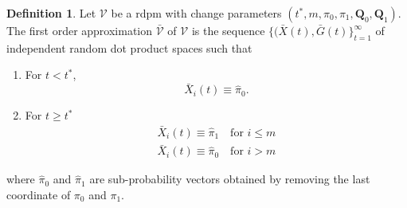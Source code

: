 \documentclass[final]{IEEEtran}
\theoremstyle{definition}
\newtheorem{definition}{Definition}
\begin{document}
\begin{definition}
  \label{def:1}
  Let $\mathscr{V}$ be a rdpm with change parameters $(t^{*}, m,
  \pi_0, \pi_1, \mathbf{Q}_0, \mathbf{Q}_1)$. The first order approximation
  $\bar{\mathscr{V}}$ of $\mathscr{V}$ is the sequence $\{(\bar{X}(t),
  \bar{G}(t)\}_{t = 1}^{\infty}$ of independent random dot product
  spaces such that
 \begin{enumerate}
 \item For $t < t^{*}$,
   \begin{equation}
     \label{eq:5}
     \bar{X}_{i}(t) \equiv \hat{\pi}_0.
   \end{equation}
 \item For $t \geq t^{*}$
   \begin{gather*}
     \bar{X}_{i}(t) \equiv \hat{\pi}_1 \quad \text{for $i \leq m$} \\
     \bar{X}_{i}(t) \equiv \hat{\pi}_0 \quad \text{for $i > m$} 
   \end{gather*}
 \end{enumerate}
 where $\hat{\pi}_0$ and $\hat{\pi}_1$ are sub-probability vectors
 obtained by removing the last coordinate of $\pi_0$ and $\pi_1$. 
\end{definition}
\end{document}
